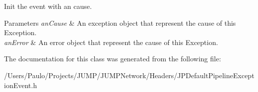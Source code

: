 Init the event with an cause. 


\begin{DoxyParams}{Parameters}
{\em anCause} & An exception object that represent the cause of this Exception. \\
\hline
{\em anError} & An error object that represent the cause of this Exception. \\
\hline
\end{DoxyParams}


The documentation for this class was generated from the following file:\begin{DoxyCompactItemize}
\item 
/Users/Paulo/Projects/JUMP/JUMPNetwork/Headers/JPDefaultPipelineExceptionEvent.h\end{DoxyCompactItemize}
